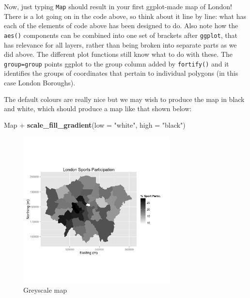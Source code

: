 \documentclass[]{article}
\newenvironment{Shaded}{}{}
\newcommand{\KeywordTok}[1]{\textcolor[rgb]{0.00,0.44,0.13}{\textbf{{#1}}}}
\newcommand{\DataTypeTok}[1]{\textcolor[rgb]{0.56,0.13,0.00}{{#1}}}
\newcommand{\StringTok}[1]{\textcolor[rgb]{0.25,0.44,0.63}{{#1}}}
\newcommand{\NormalTok}[1]{{#1}}
\begin{document}
\begin{Shaded}
\end{Shaded}
Now, just typing \texttt{Map} should result in your first ggplot-made
map of London! There is a lot going on in the code above, so think about
it line by line: what has each of the elements of code above has been
designed to do. Also note how the \texttt{aes()} components can be
combined into one set of brackets after \texttt{ggplot}, that has
relevance for all layers, rather than being broken into separate parts
as we did above. The different plot functions still know what to do with
these. The \texttt{group=group} points ggplot to the group column added
by \texttt{fortify()} and it identifies the groups of coordinates that
pertain to individual polygons (in this case London Boroughs).

The default colours are really nice but we may wish to produce the map
in black and white, which should produce a map like that shown below:

\begin{Shaded}
\begin{Highlighting}[]
\NormalTok{Map + }\KeywordTok{scale_fill_gradient}\NormalTok{(}\DataTypeTok{low =} \StringTok{"white"}\NormalTok{, }\DataTypeTok{high =} \StringTok{"black"}\NormalTok{)}
\end{Highlighting}
\end{Shaded}
\begin{figure}[htbp]
\centering
\includegraphics[width=8cm]{figure/Greyscale_map.png}
\caption{Greyscale map}
\end{figure}
\end{document}
